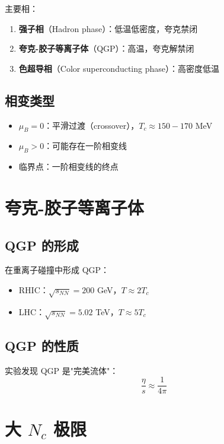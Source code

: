 \documentclass[12pt,a4paper]{ctexart}
\begin{document}
主要相：
\begin{enumerate}
    \item \textbf{强子相}（Hadron phase）：低温低密度，夸克禁闭
    \item \textbf{夸克-胶子等离子体}（QGP）：高温，夸克解禁闭
    \item \textbf{色超导相}（Color superconducting phase）：高密度低温
\end{enumerate}

\subsection{相变类型}

\begin{itemize}
    \item $\mu_B = 0$：平滑过渡（crossover），$T_c \approx 150-170$ MeV
    \item $\mu_B > 0$：可能存在一阶相变线
    \item 临界点：一阶相变线的终点
\end{itemize}

\section{夸克-胶子等离子体}

\subsection{QGP 的形成}

在重离子碰撞中形成 QGP：
\begin{itemize}
    \item RHIC：$\sqrt{s_{NN}} = 200$ GeV，$T \approx 2T_c$
    \item LHC：$\sqrt{s_{NN}} = 5.02$ TeV，$T \approx 5T_c$
\end{itemize}

\subsection{QGP 的性质}

实验发现 QGP 是"完美流体"：
\begin{equation}
    \frac{\eta}{s} \approx \frac{1}{4\pi}
\end{equation}

\section{大 $N_c$ 极限}
\end{document}
